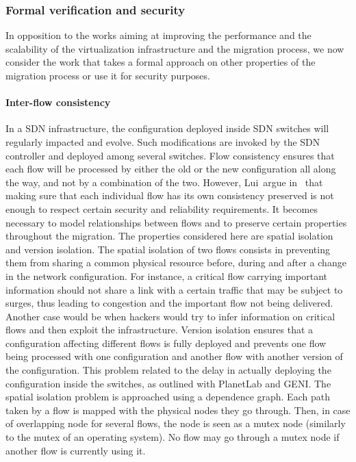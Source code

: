 \subsubsection{Formal verification and security}
In opposition to the works aiming at improving the performance and the scalability of the virtualization infrastructure and the migration process, we now consider the work that takes a formal approach on other properties of the migration process or use it for security purposes.

\paragraph{Inter-flow consistency}
In a SDN infrastructure, the configuration deployed inside SDN switches will regularly impacted and evolve. Such modifications are invoked by the SDN controller and deployed among several switches.
Flow consistency ensures that each flow will be processed by either the old or the new configuration all along the way, and not by a combination of the two.
However, Lui~\etal argue in~\cite{Liu2015a} that making sure that each individual flow has its own consistency preserved is not enough to respect certain security and reliability requirements.
It becomes necessary to model relationships between flows and to preserve certain properties throughout the migration.
The properties considered here are spatial isolation and version isolation.
The spatial isolation of two flows consists in preventing them from sharing a common physical resource before, during and after a change in the network configuration.
For instance, a critical flow carrying important information should not share a link with a certain traffic that may be subject to surges, thus leading to congestion and the important flow not being delivered. Another case would be when hackers would try to infer information on critical flows and then exploit the infrastructure.
Version isolation ensures that a configuration affecting different flows is fully deployed and prevents one flow being processed with one configuration and another flow with another version of the configuration.
This problem related to the delay in actually deploying the configuration inside the switches, as outlined with PlanetLab and GENI.
The spatial isolation problem is approached using a dependence graph. Each path taken by a flow is mapped with the physical nodes they go through. Then, in case of overlapping node for several flows, the node is seen as a mutex node (similarly to the mutex of an operating system).
No flow may go through a mutex node if another flow is currently using it.
